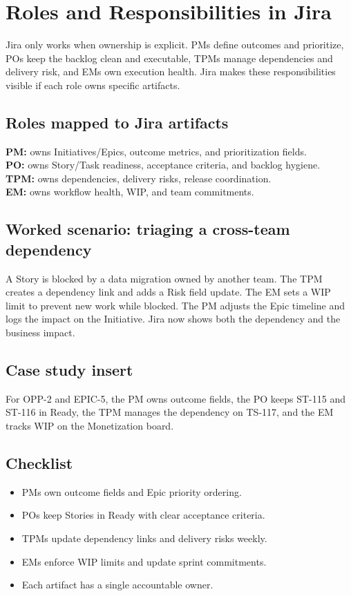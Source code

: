\section{Roles and Responsibilities in Jira}
Jira only works when ownership is explicit. PMs define outcomes and prioritize, POs keep the backlog clean and executable, TPMs manage dependencies and delivery risk, and EMs own execution health. Jira makes these responsibilities visible if each role owns specific artifacts.

\subsection{Roles mapped to Jira artifacts}
\textbf{PM:} owns Initiatives/Epics, outcome metrics, and prioritization fields.\\
\textbf{PO:} owns Story/Task readiness, acceptance criteria, and backlog hygiene.\\
\textbf{TPM:} owns dependencies, delivery risks, release coordination.\\
\textbf{EM:} owns workflow health, WIP, and team commitments.

\subsection{Worked scenario: triaging a cross-team dependency}
A Story is blocked by a data migration owned by another team. The TPM creates a dependency link and adds a Risk field update. The EM sets a WIP limit to prevent new work while blocked. The PM adjusts the Epic timeline and logs the impact on the Initiative. Jira now shows both the dependency and the business impact.

\subsection{Case study insert}
For OPP-2 and EPIC-5, the PM owns outcome fields, the PO keeps ST-115 and ST-116 in Ready, the TPM manages the dependency on TS-117, and the EM tracks WIP on the Monetization board.
\subsection{Checklist}
\begin{itemize}
  \item PMs own outcome fields and Epic priority ordering.
  \item POs keep Stories in Ready with clear acceptance criteria.
  \item TPMs update dependency links and delivery risks weekly.
  \item EMs enforce WIP limits and update sprint commitments.
  \item Each artifact has a single accountable owner.
\end{itemize}

